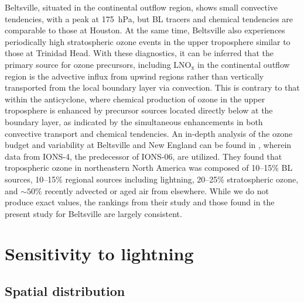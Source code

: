 Beltsville, situated in the continental outflow region, shows small convective
tendencies, with a peak at 175~hPa, but BL tracers and chemical tendencies are comparable to those at Houston.
At the same time, Beltsville also experiences periodically high stratospheric ozone events
in the upper troposphere similar to those at Trinidad Head. With these diagnostics,
it can be inferred that the primary source for ozone precursors, including
LNO$_{\mathrm{x}}$ in the continental outflow region is the advective influx from
upwind regions rather than vertically transported from the local boundary layer
via convection. This is contrary to that within the anticyclone, where chemical
production of ozone in the upper troposphere is enhanced by precursor sources
located directly below at the boundary layer, as indicated by the simultaneous
enhancements in both convective transport and chemical tendencies. An in-depth analysis of the ozone
budget and variability at Beltsville and New England can be found in
\citet{Thompson:2007gd,Thompson:2007ov}, wherein data from IONS-4, the
predecessor of IONS-06, are utilized. They found that tropospheric ozone in
northeastern North America was composed of 10--15\% BL sources, 10--15\%
regional sources including lightning, 20--25\% stratospheric ozone, and
$\sim50\%$ recently advected or aged air from elsewhere. While we
do not produce exact values, the rankings from their study and those found in
the present study for Beltsville are largely consistent.

\section{Sensitivity to lightning}\label{sect:sensitivity}

\subsection{Spatial distribution}

